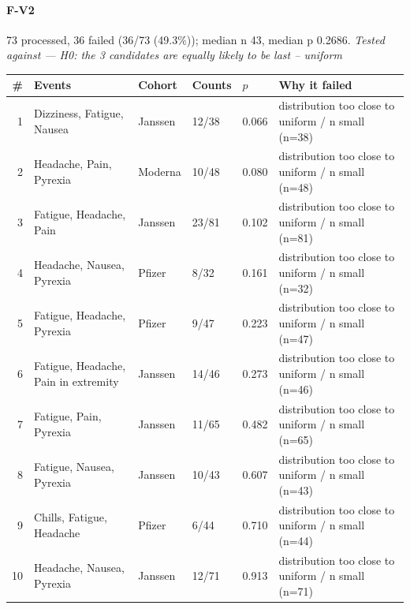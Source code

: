 \documentclass[11pt]{article}
\begin{document}
\paragraph{F-V2} 73 processed, 36 failed (36/73 (49.3\%)); median n 43, median p 0.2686. \emph{Tested against --- H0: the 3 candidates are equally likely to be last -- uniform} \\
\begin{longtable}{@{}r p{3.9cm} p{2.5cm} l l p{4.4cm}@{}}
\toprule
\# & Events & Cohort & Counts & $p$ & Why it failed \\
\midrule \endhead
1 & Dizziness, Fatigue, Nausea & Janssen & 12/38 & 0.066 & distribution too close to uniform / n small (n=38) \\
2 & Headache, Pain, Pyrexia & Moderna & 10/48 & 0.080 & distribution too close to uniform / n small (n=48) \\
3 & Fatigue, Headache, Pain & Janssen & 23/81 & 0.102 & distribution too close to uniform / n small (n=81) \\
4 & Headache, Nausea, Pyrexia & Pfizer & 8/32 & 0.161 & distribution too close to uniform / n small (n=32) \\
5 & Fatigue, Headache, Pyrexia & Pfizer & 9/47 & 0.223 & distribution too close to uniform / n small (n=47) \\
6 & Fatigue, Headache, Pain in extremity & Janssen & 14/46 & 0.273 & distribution too close to uniform / n small (n=46) \\
7 & Fatigue, Pain, Pyrexia & Janssen & 11/65 & 0.482 & distribution too close to uniform / n small (n=65) \\
8 & Fatigue, Nausea, Pyrexia & Janssen & 10/43 & 0.607 & distribution too close to uniform / n small (n=43) \\
9 & Chills, Fatigue, Headache & Pfizer & 6/44 & 0.710 & distribution too close to uniform / n small (n=44) \\
10 & Headache, Nausea, Pyrexia & Janssen & 12/71 & 0.913 & distribution too close to uniform / n small (n=71) \\
\bottomrule
\end{longtable}
\end{document}
